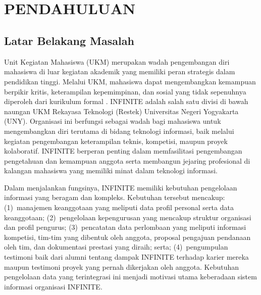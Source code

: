
\chapter[PENDAHULUAN]{\\ PENDAHULUAN}

\section{Latar Belakang Masalah}

Unit Kegiatan Mahasiswa (UKM) merupakan wadah pengembangan diri mahasiswa di luar kegiatan akademik yang memiliki peran strategis dalam pendidikan tinggi. Melalui UKM, mahasiswa dapat mengembangkan kemampuan berpikir kritis, keterampilan kepemimpinan, dan sosial yang tidak sepenuhnya diperoleh dari kurikulum formal \citep{Pertiwi_2021_PeranOrganisasi}. INFINITE adalah salah satu divisi di bawah naungan UKM Rekayasa Teknologi (Restek) Universitas Negeri Yogyakarta (UNY). Organisasi ini berfungsi sebagai wadah bagi mahasiswa untuk mengembangkan diri terutama di bidang teknologi informasi, baik melalui kegiatan pengembangan keterampilan teknis, kompetisi, maupun proyek kolaboratif. INFINITE berperan penting dalam memfasilitasi pengembangan pengetahuan dan kemampuan anggota serta membangun jejaring profesional di kalangan mahasiswa yang memiliki minat dalam teknologi informasi.

Dalam menjalankan fungsinya, INFINITE memiliki kebutuhan pengelolaan informasi yang beragam dan kompleks. Kebutuhan tersebut mencakup: (1)~manajemen keanggotaan yang meliputi data profil personal serta data keanggotaan; (2)~pengelolaan kepengurusan yang mencakup struktur organisasi dan profil pengurus; (3)~pencatatan data perlombaan yang meliputi informasi kompetisi, tim-tim yang dibentuk oleh anggota, proposal pengajuan pendanaan oleh tim, dan dokumentasi prestasi yang diraih; serta; (4)~pengumpulan testimoni baik dari alumni tentang dampak INFINITE terhadap karier mereka maupun testimoni proyek yang pernah dikerjakan oleh anggota. Kebutuhan pengelolaan data yang terintegrasi ini menjadi motivasi utama keberadaan sistem informasi organisasi INFINITE.

